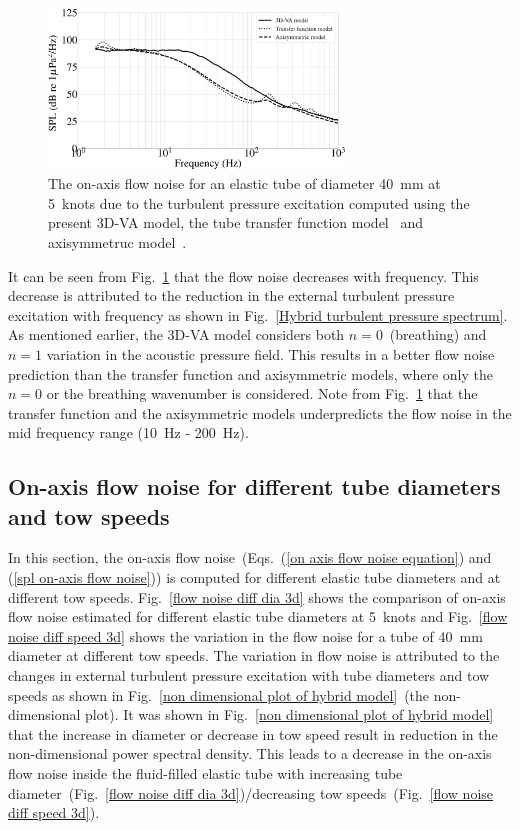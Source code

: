 \documentclass[twocolumn,10pt]{asme2ej}
\begin{document}
\begin{figure}[h]
    \centering
    \includegraphics[width=3.1in]{figure/Flow_noise_comparison_3D_vs_Knight_Jineesh.eps}
    \caption{The on-axis flow noise for an elastic tube of diameter 40~mm at 5~knots due to the turbulent pressure excitation computed using the present 3D-VA model, the tube transfer function model~\cite{knight1996} and axisymmetruc model~\cite{jineesh2013}.} 
    \label{3d vs knight vs jineesh}
\end{figure}



 It can be seen from Fig.~\ref{3d vs knight vs jineesh} that the flow noise decreases with frequency. This decrease is attributed to the reduction in the external turbulent pressure excitation with frequency as shown in Fig.~\ref{Hybrid turbulent pressure spectrum}. As mentioned earlier, the 3D-VA model considers both $n=0$~(breathing) and $n=1$ variation in the acoustic pressure field. This results in a better flow noise prediction than the transfer function and axisymmetric models, where only the $n=0$ or the breathing wavenumber is considered. Note from Fig.~\ref{3d vs knight vs jineesh} that the transfer function and the axisymmetric models underpredicts the flow noise in the mid frequency range (10~Hz - 200~Hz).


\subsection{On-axis flow noise for different tube diameters and tow speeds}
\label{parametric study}

In this section, the on-axis flow noise~(Eqs.~(\ref{on axis flow noise equation}) and (\ref{spl on-axis flow noise})) is computed for different elastic tube diameters and at different tow speeds. Fig.~\ref{flow noise diff dia 3d} shows the comparison of on-axis flow noise estimated for different elastic tube diameters at 5~knots and  Fig.~\ref{flow noise diff speed 3d} shows the variation in the flow noise for a tube of 40~mm diameter at different tow speeds. The variation in flow noise is attributed to the changes in external turbulent pressure excitation with tube diameters and tow speeds as shown in Fig.~\ref{non dimensional plot of hybrid model}~(the non-dimensional plot). It was shown in Fig.~\ref{non dimensional plot of hybrid model} that the increase in diameter or decrease in tow speed result in reduction in the non-dimensional power spectral density. This leads to a decrease in the on-axis flow noise inside the fluid-filled elastic tube with increasing tube diameter~(Fig.~\ref{flow noise diff dia 3d})/decreasing tow speeds~(Fig.~\ref{flow noise diff speed 3d}).
\end{document}

